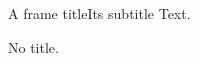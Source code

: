 \documentclass{beamer}
\begin{document}
\begin{frame}{A frame title}{Its subtitle}
Text.
\end{frame}
\begin{frame}
No title.
\end{frame}
\end{document}
